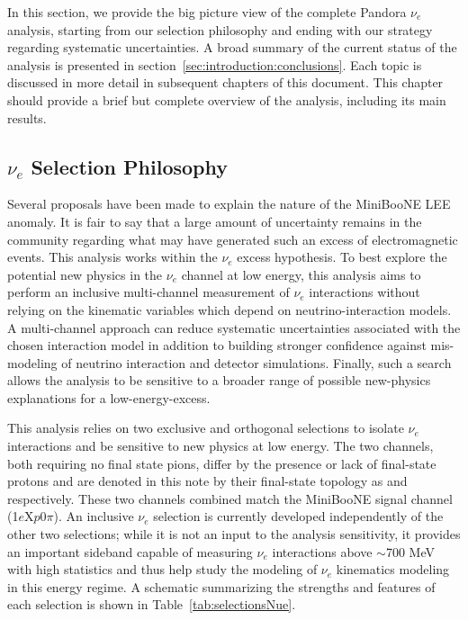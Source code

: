 In this section, we provide the big picture view of the complete Pandora $\nu_e$ analysis, starting from our selection philosophy and ending with our strategy regarding systematic uncertainties. A broad summary of the current status of the analysis is presented in section~\ref{sec:introduction:conclusions}. Each topic is discussed in more detail in subsequent chapters of this document.  This chapter should provide a brief but complete overview of the analysis, including its main results.

\subsection{$\nu_e$ Selection Philosophy} %
\par Several proposals have been made to explain the nature of the MiniBooNE LEE anomaly. It is fair to say that a large amount of uncertainty remains in the community regarding what may have generated such an excess of electromagnetic events. This analysis works within the $\nu_e$ excess hypothesis.  To best explore the potential new physics in the $\nu_e$ channel at low energy, this analysis aims to perform an inclusive multi-channel measurement of $\nu_e$ interactions without relying on the kinematic variables which depend on neutrino-interaction models. A multi-channel approach can reduce systematic uncertainties associated with the chosen interaction model in addition to building stronger confidence against mis-modeling of neutrino interaction and detector simulations. Finally, such a search allows the analysis to be sensitive to a broader range of possible new-physics explanations for a low-energy-excess.

\par This analysis relies on two exclusive and orthogonal selections to isolate $\nu_e$ interactions and be sensitive to new physics at low energy. The two channels, both requiring no final state pions, differ by the presence or lack of final-state protons and are denoted in this note by their final-state topology as \npsel and \zpsel respectively. These two channels combined match the MiniBooNE signal channel (1$e$X$p$0$\pi$). An inclusive $\nu_e$ selection is currently developed independently of the other two selections; while it is not an input to the analysis sensitivity, it provides an important sideband capable of measuring $\nu_e$ interactions above $\sim$700 MeV with high statistics and thus help study the modeling of $\nu_e$ kinematics modeling in this energy regime. A schematic summarizing the strengths and features of each selection is shown in Table~\ref{tab:selectionsNue}. 

